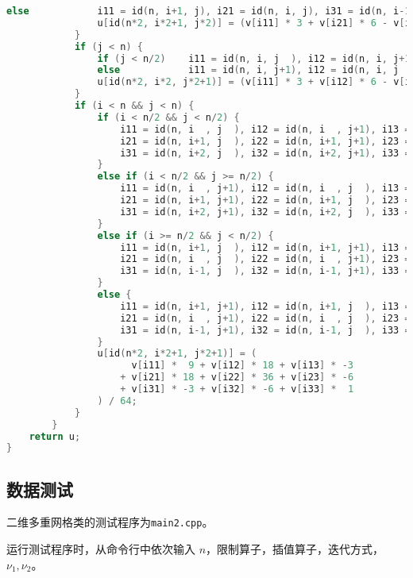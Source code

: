 \documentclass{ctexart}
\begin{document}
\begin{lstlisting}[language=c++]
				else 			i11 = id(n, i+1, j), i21 = id(n, i, j), i31 = id(n, i-1, j);
				u[id(n*2, i*2+1, j*2)] = (v[i11] * 3 + v[i21] * 6 - v[i31]) / 8;
			}
			if (j < n) {
				if (j < n/2)	i11 = id(n, i, j  ), i12 = id(n, i, j+1), i13 = id(n, i, j+2);
				else			i11 = id(n, i, j+1), i12 = id(n, i, j  ), i13 = id(n, i, j-1);
				u[id(n*2, i*2, j*2+1)] = (v[i11] * 3 + v[i12] * 6 - v[i13]) / 8;
			}
			if (i < n && j < n) {
				if (i < n/2 && j < n/2) {
					i11 = id(n, i  , j  ), i12 = id(n, i  , j+1), i13 = id(n, i  , j+2);
					i21 = id(n, i+1, j  ), i22 = id(n, i+1, j+1), i23 = id(n, i+1, j+2);
					i31 = id(n, i+2, j  ), i32 = id(n, i+2, j+1), i33 = id(n, i+2, j+2);
				}
				else if (i < n/2 && j >= n/2) {
					i11 = id(n, i  , j+1), i12 = id(n, i  , j  ), i13 = id(n, i  , j-1);
					i21 = id(n, i+1, j+1), i22 = id(n, i+1, j  ), i23 = id(n, i+1, j-1);
					i31 = id(n, i+2, j+1), i32 = id(n, i+2, j  ), i33 = id(n, i+2, j-1);
				}
				else if (i >= n/2 && j < n/2) {
					i11 = id(n, i+1, j  ), i12 = id(n, i+1, j+1), i13 = id(n, i+1, j+2);
					i21 = id(n, i  , j  ), i22 = id(n, i  , j+1), i23 = id(n, i  , j+2);
					i31 = id(n, i-1, j  ), i32 = id(n, i-1, j+1), i33 = id(n, i-1, j+2);
				}
				else {
					i11 = id(n, i+1, j+1), i12 = id(n, i+1, j  ), i13 = id(n, i+1, j-1);
					i21 = id(n, i  , j+1), i22 = id(n, i  , j  ), i23 = id(n, i  , j-1);
					i31 = id(n, i-1, j+1), i32 = id(n, i-1, j  ), i33 = id(n, i-1, j-1);
				}
				u[id(n*2, i*2+1, j*2+1)] = (
					  v[i11] *  9 + v[i12] * 18 + v[i13] * -3
					+ v[i21] * 18 + v[i22] * 36 + v[i23] * -6
					+ v[i31] * -3 + v[i32] * -6 + v[i33] *  1
				) / 64;
			}
		}
	return u;
}
\end{lstlisting}

\subsection{数据测试}

二维多重网格类的测试程序为\verb|main2.cpp|。

运行测试程序时，从命令行中依次输入 $n$，限制算子，插值算子，迭代方式，$\nu_1,\nu_2$。
\end{document}
